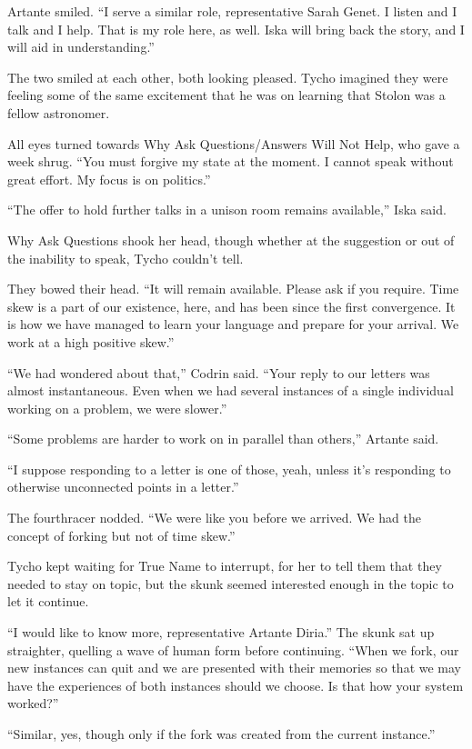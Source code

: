 Artante smiled. ``I serve a similar role, representative Sarah Genet. I listen and I talk and I help. That is my role here, as well. Iska will bring back the story, and I will aid in understanding.''

The two smiled at each other, both looking pleased. Tycho imagined they were feeling some of the same excitement that he was on learning that Stolon was a fellow astronomer.

All eyes turned towards Why Ask Questions/Answers Will Not Help, who gave a week shrug. ``You must forgive my state at the moment. I cannot speak without great effort. My focus is on politics.''

``The offer to hold further talks in a unison room remains available,'' Iska said.

Why Ask Questions shook her head, though whether at the suggestion or out of the inability to speak, Tycho couldn't tell.

They bowed their head. ``It will remain available. Please ask if you require. Time skew is a part of our existence, here, and has been since the first convergence. It is how we have managed to learn your language and prepare for your arrival. We work at a high positive skew.''

``We had wondered about that,'' Codrin said. ``Your reply to our letters was almost instantaneous. Even when we had several instances of a single individual working on a problem, we were slower.''

``Some problems are harder to work on in parallel than others,'' Artante said.

``I suppose responding to a letter is one of those, yeah, unless it's responding to otherwise unconnected points in a letter.''

The fourthracer nodded. ``We were like you before we arrived. We had the concept of forking but not of time skew.''

Tycho kept waiting for True Name to interrupt, for her to tell them that they needed to stay on topic, but the skunk seemed interested enough in the topic to let it continue.

``I would like to know more, representative Artante Diria.'' The skunk sat up straighter, quelling a wave of human form before continuing. ``When we fork, our new instances can quit and we are presented with their memories so that we may have the experiences of both instances should we choose. Is that how your system worked?''

``Similar, yes, though only if the fork was created from the current instance.''

